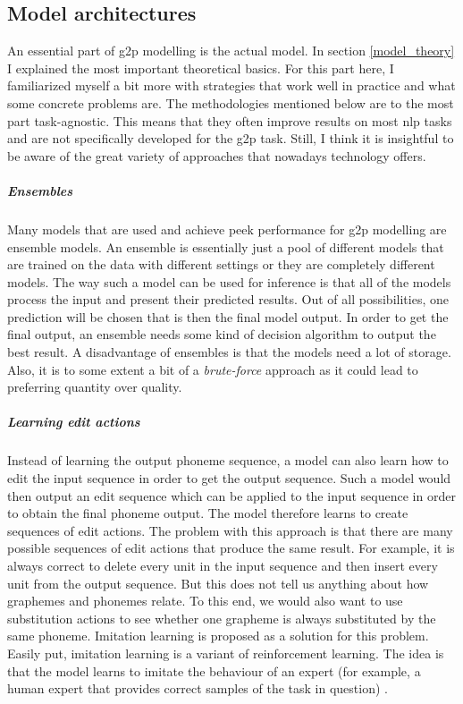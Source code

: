 \subsection{Model architectures}
An essential part of \ac{g2p} modelling is the actual model. In section \ref{model_theory} I explained the most important theoretical basics. For this part here, I familiarized myself a bit more with strategies that work well in practice and what some concrete problems are. The methodologies mentioned below are to the most part task-agnostic. This means that they often improve results on most \ac{nlp} tasks and are not specifically developed for the \ac{g2p} task. Still, I think it is insightful to be aware of the great variety of approaches that nowadays technology offers. 

\subparagraph{Ensembles}
Many models that are used and achieve peek performance for \ac{g2p} modelling are ensemble models. An ensemble is essentially just a pool of different models that are trained on the data with different settings or they are completely different models. The way such a model can be used for inference is that all of the models process the input and present their predicted results. Out of all possibilities, one prediction will be chosen that is then the final model output. In order to get the final output, an ensemble needs some kind of decision algorithm to output the best result. A disadvantage of ensembles is that the models need a lot of storage. Also, it is to some extent a bit of a \textit{brute-force} approach as it could lead to preferring quantity over quality. 

\subparagraph{Learning edit actions}
Instead of learning the output phoneme sequence, a model can also learn how to edit the input sequence in order to get the output sequence. Such a model would then output an edit sequence which can be applied to the input sequence in order to obtain the final phoneme output. The model therefore learns to create sequences of edit actions. The problem with this approach is that there are many possible sequences of edit actions that produce the same result. For example, it is always correct to delete every unit in the input sequence and then insert every unit from the output sequence. But this does not tell us anything about how graphemes and phonemes relate. To this end, we would also want to use substitution actions to see whether one grapheme is always substituted by the same phoneme. Imitation learning is proposed as a solution for this problem. Easily put, imitation learning is a variant of reinforcement learning. The idea is that the model learns to imitate the behaviour of an expert (for example, a human expert that provides correct samples of the task in question) \citep{Ai.2019}. 


